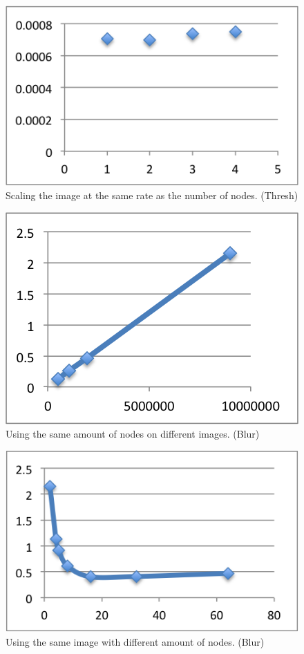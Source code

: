 \documentclass[a4paper]{article}
\begin{document}
\begin{figure}
  \centering
  \includegraphics{scale.png}
  \caption{Scaling the image at the same rate as the number of nodes. (Thresh)}
  \label{tab:fig3}
\end{figure}

\begin{figure}
  \centering
  \includegraphics{processorBlur.png}
  \caption{Using the same amount of nodes on different images. (Blur)}
  \label{tab:fig4}
\end{figure}

\begin{figure}
  \centering
  \includegraphics{imageBlur.png}
  \caption{Using the same image with different amount of nodes. (Blur)}
  \label{tab:fig5}
\end{figure}
\end{document}

